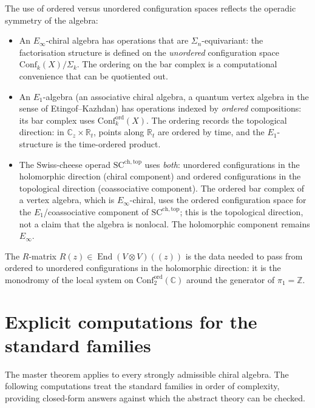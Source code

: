 \begin{remark}
\label{rem:why-ordered-spaces}
The use of ordered versus unordered configuration spaces
reflects the operadic symmetry of the algebra:
\begin{itemize}
\item An $E_\infty$-chiral algebra has operations that are
 $\Sigma_n$-equivariant:
 the factorisation structure is defined on the \emph{unordered}
 configuration space $\mathrm{Conf}_k(X)/\Sigma_k$. The
 ordering on the bar complex is a computational convenience
 that can be quotiented out.
\item An $E_1$-algebra (an associative chiral algebra, a
 quantum vertex algebra in the sense of Etingof--Kazhdan)
 has operations indexed by \emph{ordered} compositions:
 its bar complex uses
 $\mathrm{Conf}_k^{\mathrm{ord}}(X)$. The ordering
 records the topological direction: in
 $\mathbb C_z\times\mathbb R_t$, points along
 $\mathbb R_t$ are ordered by time, and the
 $E_1$-structure is the time-ordered product.
\item The Swiss-cheese operad $\mathrm{SC}^{\mathrm{ch,top}}$
 uses \emph{both}: unordered configurations in the
 holomorphic direction (chiral component) and ordered
 configurations in the topological direction (coassociative component).
 The ordered bar complex of a vertex algebra, which is
 $E_\infty$-chiral, uses the ordered configuration space
 for the $E_1$/coassociative component of $\mathrm{SC}^{\mathrm{ch,top}}$;
 this is the topological direction, not a claim that the
 algebra is nonlocal. The holomorphic component remains
 $E_\infty$.
\end{itemize}
The $R$-matrix $R(z)\in\operatorname{End}(V\otimes V)(\!(z)\!)$
is the data needed to pass from ordered to unordered
configurations in the holomorphic direction: it is the
monodromy of the local system on
$\mathrm{Conf}_2^{\mathrm{ord}}(\mathbb C)$ around the
generator of $\pi_1=\mathbb Z$.
\end{remark}


\section{Explicit computations for the standard families}
\label{sec:explicit-computations}

The master theorem applies to every strongly admissible chiral algebra.
The following computations treat the standard families in order of
complexity, providing closed-form answers against which the abstract
theory can be checked.

